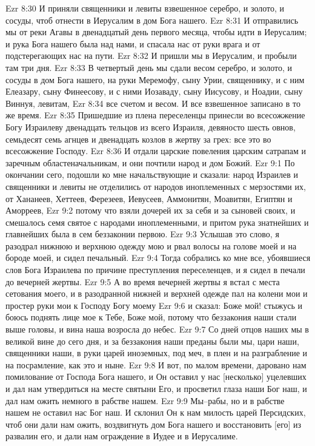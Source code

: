 Ezr 8:30  И приняли священники и левиты взвешенное серебро, и золото, и сосуды, чтоб отнести в Иерусалим в дом Бога нашего.
Ezr 8:31  И отправились мы от реки Агавы в двенадцатый день первого месяца, чтобы идти в Иерусалим; и рука Бога нашего была над нами, и спасала нас от руки врага и от подстерегающих нас на пути.
Ezr 8:32  И пришли мы в Иерусалим, и пробыли там три дня.
Ezr 8:33  В четвертый день мы сдали весом серебро, и золото, и сосуды в дом Бога нашего, на руки Меремофу, сыну Урии, священнику, и с ним Елеазару, сыну Финеесову, и с ними Иозаваду, сыну Иисусову, и Ноадии, сыну Виннуя, левитам,
Ezr 8:34  все счетом и весом. И все взвешенное записано в то же время.
Ezr 8:35  Пришедшие из плена переселенцы принесли во всесожжение Богу Израилеву двенадцать тельцов из всего Израиля, девяносто шесть овнов, семьдесят семь агнцев и двенадцать козлов в жертву за грех: все это во всесожжение Господу.
Ezr 8:36  И отдали царские повеления царским сатрапам и заречным областеначальникам, и они почтили народ и дом Божий.
Ezr 9:1  По окончании сего, подошли ко мне начальствующие и сказали: народ Израилев и священники и левиты не отделились от народов иноплеменных с мерзостями их, от Хананеев, Хеттеев, Ферезеев, Иевусеев, Аммонитян, Моавитян, Египтян и Аморреев,
Ezr 9:2  потому что взяли дочерей их за себя и за сыновей своих, и смешалось семя святое с народами иноплеменными, и притом рука знатнейших и главнейших была в сем беззаконии первою.
Ezr 9:3  Услышав это слово, я разодрал нижнюю и верхнюю одежду мою и рвал волосы на голове моей и на бороде моей, и сидел печальный.
Ezr 9:4  Тогда собрались ко мне все, убоявшиеся слов Бога Израилева по причине преступления переселенцев, и я сидел в печали до вечерней жертвы.
Ezr 9:5  А во время вечерней жертвы я встал с места сетования моего, и в разодранной нижней и верхней одежде пал на колени мои и простер руки мои к Господу Богу моему
Ezr 9:6  и сказал: Боже мой! стыжусь и боюсь поднять лице мое к Тебе, Боже мой, потому что беззакония наши стали выше головы, и вина наша возросла до небес.
Ezr 9:7  Со дней отцов наших мы в великой вине до сего дня, и за беззакония наши преданы были мы, цари наши, священники наши, в руки царей иноземных, под меч, в плен и на разграбление и на посрамление, как это и ныне.
Ezr 9:8  И вот, по малом времени, даровано нам помилование от Господа Бога нашего, и Он оставил у нас [несколько] уцелевших и дал нам утвердиться на месте святыни Его, и просветил глаза наши Бог наш, и дал нам ожить немного в рабстве нашем.
Ezr 9:9  Мы--рабы, но и в рабстве нашем не оставил нас Бог наш. И склонил Он к нам милость царей Персидских, чтоб они дали нам ожить, воздвигнуть дом Бога нашего и восстановить [его] из развалин его, и дали нам ограждение в Иудее и в Иерусалиме.
